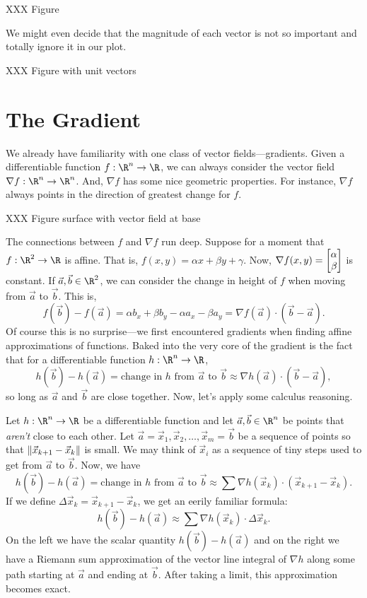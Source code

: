 XXX Figure

We might even decide that the magnitude of each vector is not so important
and totally ignore it in our plot.

XXX Figure with unit vectors


\begin{exercises}
\end{exercises}

\section{The Gradient}

We already have familiarity with one class of vector fields---gradients.
Given a differentiable function $f:\R^n\to\R$, we can always consider the
vector field $\nabla f:\R^n\to\R^n$.  And, $\nabla f$ has some nice geometric
properties.  For instance, $\nabla f$ always points in the direction
of greatest change for $f$.

XXX Figure surface with vector field at base

The connections between $f$ and $\nabla f$ run deep.  Suppose
for a moment that $f:\R^2\to\R$ is affine.  That is, $f(x,y)=\alpha x+\beta y+\gamma$. 
Now, $\nabla f(x,y)=\mat{\alpha\\\beta}$ is
constant.  If $\vec a,\vec b\in\R^2$, we can consider the change in height
of $f$ when moving from $\vec a$ to $\vec b$.  This is,
\[
	f(\vec b)-f(\vec a) = \alpha b_x+\beta b_y - \alpha a_x - \beta a_y
	=\nabla f(\vec a)\cdot (\vec b-\vec a).
\]
Of course this is no surprise---we first encountered
gradients when finding affine approximations of
functions.  Baked into the very core of the gradient is the fact that for a 
differentiable function $h:\R^n\to\R$,
\[
	h(\vec b)-h(\vec a)=\text{change in }h\text{ from }\vec a\text{ to }\vec b
	\approx \nabla h(\vec a)\cdot (\vec b-\vec a),
\]
so long as $\vec a$ and $\vec b$ are close together.  Now, let's apply
some calculus reasoning.

Let $h:\R^n\to\R$ be a differentiable function and let $\vec a,\vec b\in\R^n$
be points that \emph{aren't} close to each other.  Let $\vec a=\vec x_1,\vec x_2,\ldots,\vec
x_m=\vec b$ be a sequence of points so that $\lVert\vec x_{k+1}-\vec x_k\rVert$ is small.
We may think of $\vec x_i$ as a sequence of tiny steps used to get from $\vec a$ to
$\vec b$.  Now, we have
\[
	h(\vec b)-h(\vec a)=\text{change in }h\text{ from }\vec a\text{ to }\vec b
	\approx 
	\sum \nabla h(\vec x_k)\cdot (\vec x_{k+1}-\vec x_k).
\]
If we define $\Delta \vec x_k=\vec x_{k+1}-\vec x_k$, we get an eerily familiar
formula:
\[
	h(\vec b)-h(\vec a)
	\approx 
	\sum \nabla h(\vec x_k)\cdot \Delta \vec x_k.
\]
On the left we have the scalar quantity $h(\vec b)-h(\vec a)$ and on the right
we have a Riemann sum approximation of the vector line integral
of $\nabla h$ along some path starting at $\vec a$ and ending at $\vec b$.  After
taking a limit, this approximation becomes exact.

